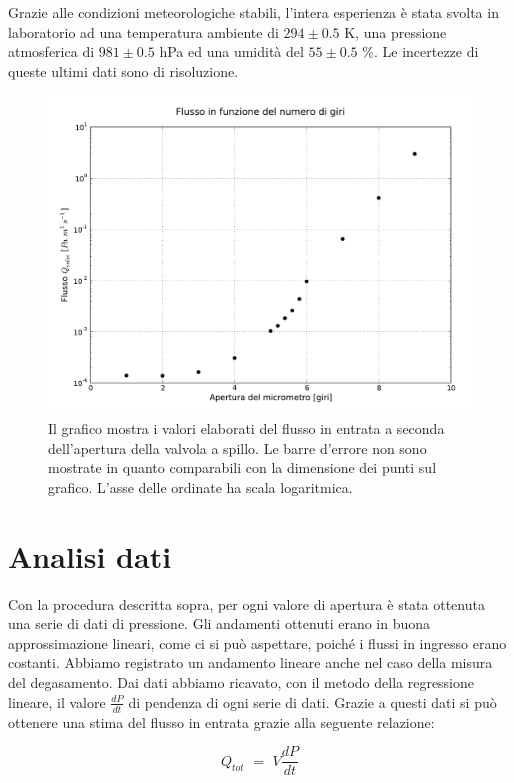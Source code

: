 Grazie alle condizioni meteorologiche stabili, l'intera esperienza è stata svolta in laboratorio ad una temperatura ambiente di $294 \pm 0.5$ \si{\kelvin}, una pressione atmosferica di $981 \pm 0.5$ hPa ed una umidità del $55 \pm 0.5$ \%. Le incertezze di queste ultimi dati sono di risoluzione.

\begin{figure}[h!]
    \centering
    \includegraphics[width=14cm]{graph.pdf}
    \caption{Il grafico mostra i valori elaborati del flusso in entrata a seconda dell'apertura della valvola a spillo. Le barre d'errore non sono
    mostrate in quanto comparabili con la dimensione dei punti sul grafico. L'asse delle ordinate ha scala logaritmica.}
    \label{fig:graph}
\end{figure}

\section{Analisi dati}

Con la procedura descritta sopra, per ogni valore di apertura è stata ottenuta una serie di dati di pressione.
Gli andamenti ottenuti erano in buona approssimazione lineari, come ci si può aspettare, poiché i flussi in ingresso erano costanti.
Abbiamo registrato un andamento lineare anche nel caso della misura del degasamento.
Dai dati abbiamo ricavato, con il metodo della regressione lineare, il valore $\frac{dP}{dt}$ di pendenza di ogni serie di dati.
Grazie a questi dati si può ottenere una stima del flusso in entrata grazie alla seguente relazione:

\begin{equation}
	Q_{tot} \,\, = \,\, V \frac{dP}{dt}
\end{equation}

